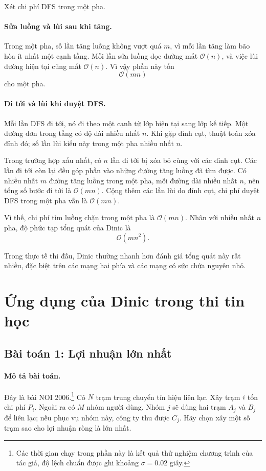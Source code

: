 \documentclass[11pt]{article}
\newcommand{\Oh}{\mathcal{O}}
\begin{document}
Xét chi phí DFS trong một pha.

\paragraph{Sửa luồng và lùi sau khi tăng.}
Trong một pha, số lần tăng luồng không vượt quá \(m\), vì mỗi lần tăng làm bão
hòa ít nhất một cạnh tầng. Mỗi lần sửa luồng dọc đường mất \(\Oh(n)\), và việc
lùi đường hiện tại cũng mất \(\Oh(n)\). Vì vậy phần này tốn
\[
  \Oh(mn)
\]
cho một pha.

\paragraph{Đi tới và lùi khi duyệt DFS.}
Mỗi lần DFS đi tới, nó đi theo một cạnh từ lớp hiện tại sang lớp kế tiếp. Một
đường đơn trong tầng có độ dài nhiều nhất \(n\). Khi gặp đỉnh cụt, thuật toán
xóa đỉnh đó; số lần lùi kiểu này trong một pha nhiều nhất \(n\).

Trong trường hợp xấu nhất, có \(n\) lần đi tới bị xóa bỏ cùng với các đỉnh cụt.
Các lần đi tới còn lại đều góp phần vào những đường tăng luồng đã tìm được.
Có nhiều nhất \(m\) đường tăng luồng trong một pha, mỗi đường dài nhiều nhất
\(n\), nên tổng số bước đi tới là \(\Oh(mn)\). Cộng thêm các lần lùi do đỉnh
cụt, chi phí duyệt DFS trong một pha vẫn là \(\Oh(mn)\).

Vì thế, chi phí tìm luồng chặn trong một pha là \(\Oh(mn)\). Nhân với nhiều
nhất \(n\) pha, độ phức tạp tổng quát của Dinic là
\[
  \Oh(mn^2).
\]

Trong thực tế thi đấu, Dinic thường nhanh hơn đánh giá tổng quát này rất nhiều,
đặc biệt trên các mạng hai phía và các mạng có sức chứa nguyên nhỏ.

\section{Ứng dụng của Dinic trong thi tin học}

\subsection{Bài toán 1: Lợi nhuận lớn nhất}

\paragraph{Mô tả bài toán.}
Đây là bài NOI 2006.\footnote{Các thời gian chạy trong phần này là kết quả
thử nghiệm chương trình của tác giả, độ lệch chuẩn được ghi khoảng
\(\sigma=0.02\) giây.} Có \(N\) trạm trung chuyển tín hiệu liên lạc. Xây trạm
\(i\) tốn chi phí
\(P_i\). Ngoài ra có \(M\) nhóm người dùng. Nhóm \(j\) sẽ dùng hai trạm
\(A_j\) và \(B_j\) để liên lạc; nếu phục vụ nhóm này, công ty thu được
\(C_j\). Hãy chọn xây một số trạm sao cho lợi nhuận ròng là lớn nhất.
\end{document}
